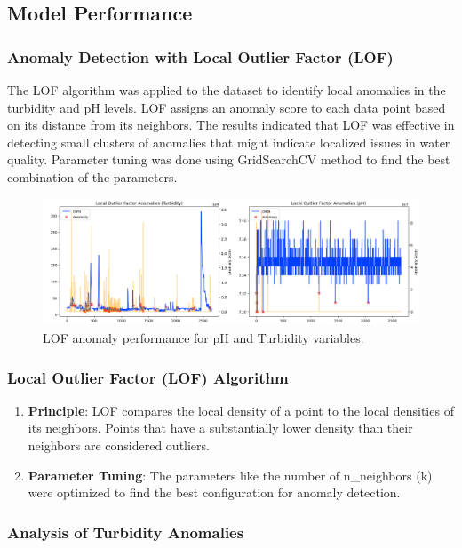 \documentclass[12pt]{report}
\begin{document}
 \newpage
 \subsection{Model  Performance}
\subsubsection{Anomaly Detection with Local Outlier Factor (LOF)}
The LOF algorithm was applied to the dataset to identify local anomalies in the turbidity and pH levels. LOF assigns an anomaly score to each data point based on its distance from its neighbors. The results indicated that LOF was effective in detecting small clusters of anomalies that might indicate localized issues in water quality.
Parameter  tuning  was  done  using  GridSearchCV  method to find  the  best  combination of  the  parameters. 

\begin{figure}[h]
    \centering
    \includegraphics[width=1 \linewidth]{lof_performance.png}
    \caption{LOF anomaly performance for pH  and  Turbidity  variables.}
    \label{fig:enter-label}
\end{figure}
\subsubsection{Local Outlier Factor (LOF) Algorithm}

\begin{enumerate}
    \item \textbf{Principle}: LOF compares the local density of a point to the local densities of its neighbors. Points that have a substantially lower density than their neighbors are considered outliers.
    
    \item \textbf{Parameter Tuning}: The parameters like the number of n\_neighbors (k) were optimized to find the best configuration for anomaly detection.
\end{enumerate}

\subsubsection{Analysis of Turbidity Anomalies}
\end{document}
